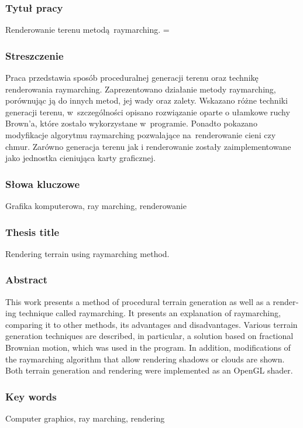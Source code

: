 \subsubsection*{Tytuł pracy} 
\Title Renderowanie terenu metodą raymarching.
\emergencystretch=\maxdimen

\subsubsection*{Streszczenie}  
Praca przedstawia sposób proceduralnej generacji terenu oraz technikę renderowania raymarching.
Zaprezentowano działanie metody raymarching, porównując ją do innych metod, jej wady oraz zalety. Wskazano różne techniki generacji terenu, w~szczególności opisano rozwiązanie oparte o ułamkowe ruchy Brown'a, które zostało wykorzystane w~programie. Ponadto pokazano modyfikacje algorytmu raymarching pozwalające na~renderowanie cieni czy chmur. Zarówno generacja terenu jak i renderowanie zostały zaimplementowane jako jednostka cieniująca karty graficznej.

\subsubsection*{Słowa kluczowe} 
Grafika komputerowa, ray marching, renderowanie

\subsubsection*{Thesis title} 
\begin{otherlanguage}{british}
\TitleAlt Rendering terrain using raymarching method.
\end{otherlanguage}

\subsubsection*{Abstract} 
\begin{otherlanguage}{british}
This work presents a method of procedural terrain generation as well as a rendering technique called raymarching.
It presents an explanation of raymarching, comparing it to other methods, its advantages and disadvantages. Various terrain generation techniques are described, in particular, a solution based on fractional Brownian motion, which was used in the program. In addition, modifications of the raymarching algorithm that allow rendering shadows or clouds are shown. Both terrain generation and rendering were implemented as an OpenGL shader.
\end{otherlanguage}
\subsubsection*{Key words}  
\begin{otherlanguage}{british}
Computer graphics, ray marching, rendering
\end{otherlanguage}

